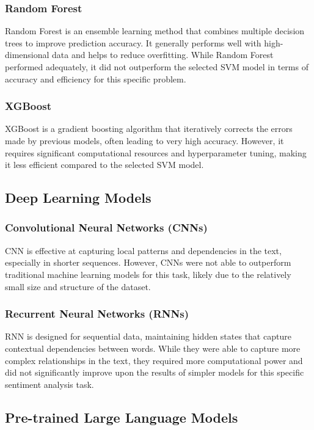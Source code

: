 \documentclass[a4paper,40pt,twocolumn]{article}
\begin{document}
\subsubsection{Random Forest}
Random Forest is an ensemble learning method that combines multiple decision trees to improve prediction accuracy. It generally performs well with high-dimensional data and helps to reduce overfitting. While Random Forest performed adequately, it did not outperform the selected SVM model in terms of accuracy and efficiency for this specific problem.

\subsubsection{XGBoost}
XGBoost is a gradient boosting algorithm that iteratively corrects the errors made by previous models, often leading to very high accuracy. However, it requires significant computational resources and hyperparameter tuning, making it less efficient compared to the selected SVM model.

\subsection{Deep Learning Models}
\subsubsection{Convolutional Neural Networks (CNNs)}
CNN is effective at capturing local patterns and dependencies in the text, especially in shorter sequences. However, CNNs were not able to outperform traditional machine learning models for this task, likely due to the relatively small size and structure of the dataset.

\subsubsection{Recurrent Neural Networks (RNNs)}
RNN is designed for sequential data, maintaining hidden states that capture contextual dependencies between words. While they were able to capture more complex relationships in the text, they required more computational power and did not significantly improve upon the results of simpler models for this specific sentiment analysis task.

\subsection{Pre-trained Large Language Models}
\end{document}
